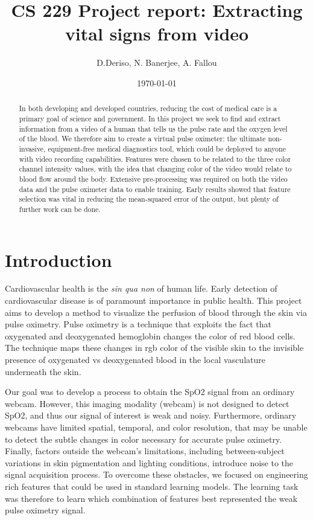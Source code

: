\documentclass[12pt]{article}
\begin{document}
  \title{CS 229 Project report: Extracting vital signs from video}
  \author{D.Deriso, N. Banerjee, A. Fallou}
  \date{\today}
  \maketitle
  \thispagestyle{empty}
\begin{abstract}
In both developing and developed countries, reducing the cost of medical care is a primary goal of science and government. In this project we seek to find and extract information from a video of a human that tells us the pulse rate and the oxygen level of the blood. We therefore aim to create a virtual pulse oximeter: the ultimate non-invasive, equipment-free medical diagnostics tool, which could be deployed to anyone with video recording capabilities. Features were chosen to be related to the three color channel intensity values, with the idea that changing color of the video would relate to blood flow around the body. Extensive pre-processing was required on both the video data and the pulse oximeter data to enable training. Early results showed that feature selection was vital in reducing the mean-squared error of the output, but plenty of further work can be done.

\end{abstract}


\section{Introduction}
%
\small  
Cardiovascular health is the \emph{sin qua non} of human life. Early detection of cardiovascular disease is of paramount importance in public health. This project aims to develop a method to visualize the perfusion of blood through the skin via pulse oximetry. Pulse oximetry is a technique that exploits the fact that oxygenated and deoxygenated hemoglobin changes the color of red blood cells. The technique maps these changes in rgb color of the visible skin to the invisible presence of oxygenated vs deoxygenated blood in the local vasculature underneath the skin.

Our goal was to develop a process to obtain the SpO2 signal from an ordinary webcam. However, this imaging modality (webcam) is not designed to detect SpO2, and thus our signal of interest is weak and noisy. Furthermore, ordinary webcams have limited spatial, temporal, and color resolution, that may be unable to detect the subtle changes in color necessary for accurate pulse oximetry. Finally, factors outside the webcam’s limitations, including between-subject variations in skin pigmentation and lighting conditions, introduce noise to the signal acquisition process. To overcome these obstacles, we focused on engineering rich features that could be used in standard learning models. The learning task was therefore to learn which combination of features best represented the weak pulse oximetry signal.
\end{document}
